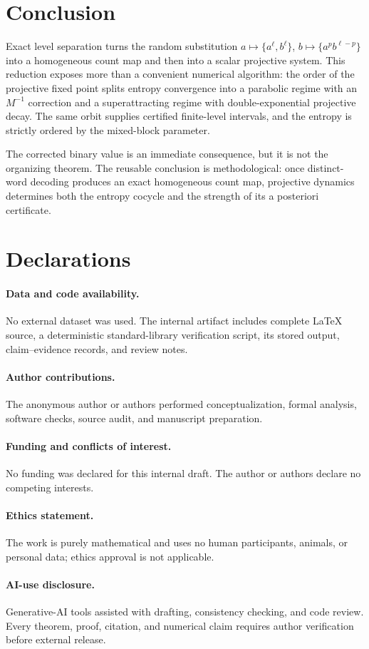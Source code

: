 \section{Conclusion}

Exact level separation turns the random substitution
$a\mapsto\{a^\ell,b^\ell\}$, $b\mapsto\{a^pb^{\ell-p}\}$ into a homogeneous
count map and then into a scalar projective system.  This reduction exposes
more than a convenient numerical algorithm: the order of the projective
fixed point splits entropy convergence into a parabolic regime with an
$M^{-1}$ correction and a superattracting regime with double-exponential
projective decay.  The same orbit supplies certified finite-level intervals,
and the entropy is strictly ordered by the mixed-block parameter.

The corrected binary value is an immediate consequence, but it is not the
organizing theorem.  The reusable conclusion is methodological: once
distinct-word decoding produces an exact homogeneous count map, projective
dynamics determines both the entropy cocycle and the strength of its
a posteriori certificate.

\section*{Declarations}

\paragraph{Data and code availability.}
No external dataset was used.  The internal artifact includes complete
\LaTeX{} source, a deterministic standard-library verification script, its
stored output, claim--evidence records, and review notes.

\paragraph{Author contributions.}
The anonymous author or authors performed conceptualization, formal analysis,
software checks, source audit, and manuscript preparation.

\paragraph{Funding and conflicts of interest.}
No funding was declared for this internal draft.  The author or authors
declare no competing interests.

\paragraph{Ethics statement.}
The work is purely mathematical and uses no human participants, animals, or
personal data; ethics approval is not applicable.

\paragraph{AI-use disclosure.}
Generative-AI tools assisted with drafting, consistency checking, and code
review.  Every theorem, proof, citation, and numerical claim requires author
verification before external release.

